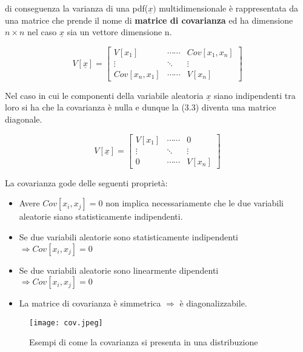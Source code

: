\documentclass[11pt,a4paper]{book}
\begin{document}
\noindent di conseguenza la varianza di una pdf($\underline{x})$ multidimensionale \`{e} rappresentata da una matrice che prende il nome di \textbf{matrice di covarianza} ed ha dimensione $n \times n$ nel caso $\underline{x}$ sia un vettore dimensione n.

\begin{equation}
	V[\underline{x}] = \begin{bmatrix}
		V[x_1] & \cdots \cdots	& Cov[x_1,x_n] \\
		\vdots & \ddots & \vdots \\
		Cov[x_n,x_1] & \cdots \cdots & V[x_n]
	\end{bmatrix}
\end{equation}
\newline

\noindent Nel caso in cui le componenti della variabile aleatoria $\underline{x}$ siano indipendenti tra loro si ha che la covarianza \`{e} nulla e dunque la (3.3) diventa una matrice diagonale.

\begin{equation}
	V[\underline{x}] = \begin{bmatrix}
		V[x_1] & \cdots \cdots	& 0 \\
		\vdots &\ddots & \vdots \\
		0 & \cdots \cdots & V[x_n]
	\end{bmatrix}
\end{equation}
\newline

La covarianza gode delle seguenti propriet\`{a}:
\begin{itemize}
	\item Avere $Cov[x_i,x_j] = 0 $ non implica necessariamente che le due variabili aleatorie siano statisticamente indipendenti.
	\item Se due variabili aleatorie sono statisticamente indipendenti \\ $\Rightarrow Cov[x_i,x_j] = 0 $
	\item Se due variabili aleatorie sono linearmente dipendenti \\$\Rightarrow Cov[x_i,x_j] = 0 $
	\item  La matrice di covarianza \`{e} simmetrica $\Rightarrow$ \`{e} diagonalizzabile.
\end{itemize}
 
 
\begin{figure}[ht]

\texttt{[image: cov.jpeg]}	
\centering
\caption{Esempi di come la covarianza si presenta in una distribuzione}
\end{figure} 
\end{document}
